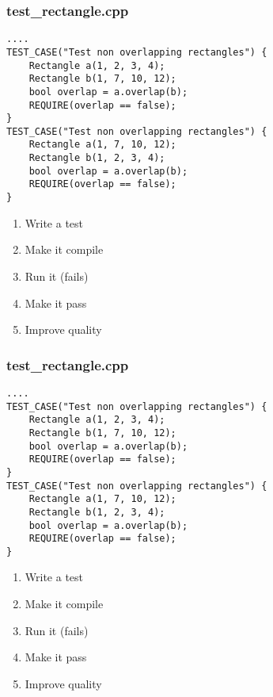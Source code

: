 \begin{frame}[fragile]
\frametitle{test\_rectangle.cpp}
\begin{minipage}[t]{0.48\linewidth}
\begin{lstlisting}
....
TEST_CASE("Test non overlapping rectangles") {
    Rectangle a(1, 2, 3, 4);
    Rectangle b(1, 7, 10, 12);
    bool overlap = a.overlap(b);
    REQUIRE(overlap == false);
}
TEST_CASE("Test non overlapping rectangles") {
    Rectangle a(1, 7, 10, 12);
    Rectangle b(1, 2, 3, 4);
    bool overlap = a.overlap(b);
    REQUIRE(overlap == false);
}
\end{lstlisting}
\end{minipage}\hfill
\begin{minipage}[t]{0.28\linewidth}
  \small
  \begin{enumerate} 
    \item \textcolor{activecolor}{Write a test}
    \item \textcolor{deadcolor}{Make it compile}
    \item \textcolor{deadcolor}{Run it (fails)}
    \item \textcolor{deadcolor}{Make it pass}
    \item \textcolor{deadcolor}{Improve quality}
  \end{enumerate} 
\end{minipage}
\end{frame}

\begin{frame}[fragile]
\frametitle{test\_rectangle.cpp}
\begin{minipage}[t]{0.48\linewidth}
\begin{lstlisting}
....
TEST_CASE("Test non overlapping rectangles") {
    Rectangle a(1, 2, 3, 4);
    Rectangle b(1, 7, 10, 12);
    bool overlap = a.overlap(b);
    REQUIRE(overlap == false);
}
TEST_CASE("Test non overlapping rectangles") {
    Rectangle a(1, 7, 10, 12);
    Rectangle b(1, 2, 3, 4);
    bool overlap = a.overlap(b);
    REQUIRE(overlap == false);
}
\end{lstlisting}
\end{minipage}\hfill
\begin{minipage}[t]{0.28\linewidth}
  \small
  \begin{enumerate} 
    \item \textcolor{deadcolor}{Write a test}
    \item \textcolor{activecolor}{Make it compile}
    \item \textcolor{deadcolor}{Run it (fails)}
    \item \textcolor{deadcolor}{Make it pass}
    \item \textcolor{deadcolor}{Improve quality}
  \end{enumerate} 
\end{minipage}
\end{frame}

